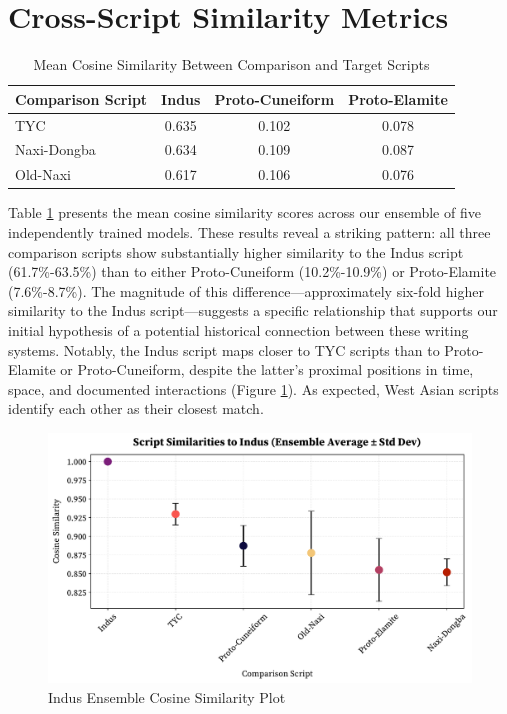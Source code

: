 \documentclass[11pt,a4paper,oneside]{report}
\begin{document}
\section{Cross-Script Similarity Metrics}
\noindent\hspace{1cm}
\begin{table}[H]
\centering
\caption{Mean Cosine Similarity Between Comparison and Target Scripts}
\label{tab:mean_similarity}
\begin{tabular}{lccc}
\hline
\textbf{Comparison Script} & \textbf{Indus} & \textbf{Proto-Cuneiform} & \textbf{Proto-Elamite} \\
\hline
TYC & 0.635 & 0.102 & 0.078 \\
Naxi-Dongba & 0.634 & 0.109 & 0.087 \\
Old-Naxi & 0.617 & 0.106 & 0.076 \\
\hline
\end{tabular}
\end{table}

Table \ref{tab:mean_similarity} presents the mean cosine similarity scores across our ensemble of five independently trained models. These results reveal a striking pattern: all three comparison scripts show substantially higher similarity to the Indus script (61.7\%-63.5\%) than to either Proto-Cuneiform (10.2\%-10.9\%) or Proto-Elamite (7.6\%-8.7\%). The magnitude of this difference—approximately six-fold higher similarity to the Indus script—suggests a specific relationship that supports our initial hypothesis of a potential historical connection between these writing systems. Notably, the Indus script maps closer to TYC scripts than to Proto-Elamite or Proto-Cuneiform, despite the latter's proximal positions in time, space, and documented interactions (Figure \ref{fig:cosine}). As expected, West Asian scripts identify each other as their closest match.

\begin{figure}[H]  
    \centering
    \includegraphics[width=1\linewidth]{Visualizations/Cosine Similarity/indus_ensemble_similarities.pdf}
    \caption{Indus Ensemble Cosine Similarity Plot}
    \label{fig:cosine}
\end{figure}
\end{document}
